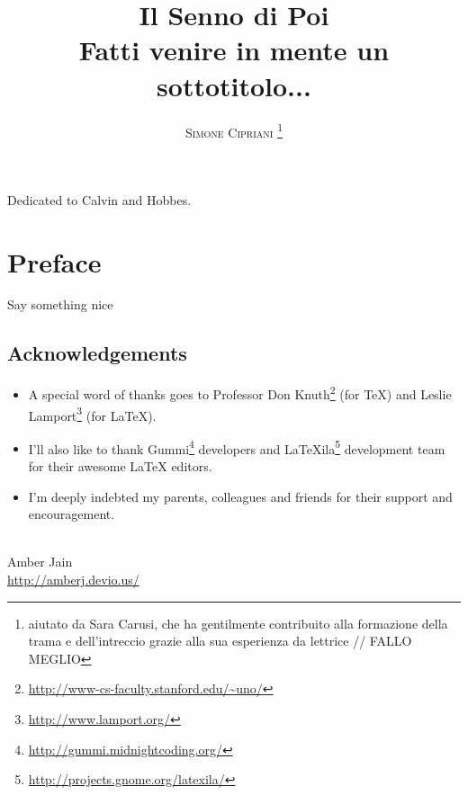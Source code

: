 \documentclass{book}
\title {
	\Huge \textbf{Il Senno di Poi}
	\\
	\huge Fatti venire in mente un sottotitolo...
}
\author{
	\textsc{Simone Cipriani}
	\thanks{aiutato da Sara Carusi, che ha gentilmente contribuito alla formazione della trama e dell'intreccio grazie alla sua esperienza da lettrice // FALLO MEGLIO }
}
\newenvironment{dedication} {
	\cleardoublepage
	\thispagestyle{empty}
	\vspace*{\stretch{1}}
	\hfill\begin{minipage}[t]{0.66\textwidth}
	\raggedright
} {
	\end{minipage}
	\vspace*{\stretch{3}}
	\clearpage
}
\begin{document}
\frontmatter
\maketitle
\begin{dedication}
Dedicated to Calvin and Hobbes.
\end{dedication}

\mainmatter

\chapter*{Preface}

Say something nice

\section*{Acknowledgements}
\begin{itemize}
	\item A special word of thanks goes to Professor Don Knuth\footnote{\url{http://www-cs-faculty.stanford.edu/~uno/}} (for \TeX{}) and Leslie Lamport\footnote{\url{http://www.lamport.org/}} (for \LaTeX{}).
	\item I'll also like to thank Gummi\footnote{\url{http://gummi.midnightcoding.org/}} developers and LaTeXila\footnote{\url{http://projects.gnome.org/latexila/}} development team for their awesome \LaTeX{} editors.
	\item I'm deeply indebted my parents, colleagues and friends for their support and encouragement.
\end{itemize}
\mbox{}\\
\noindent Amber Jain \\
\noindent \url{http://amberj.devio.us/}


\end{document}
